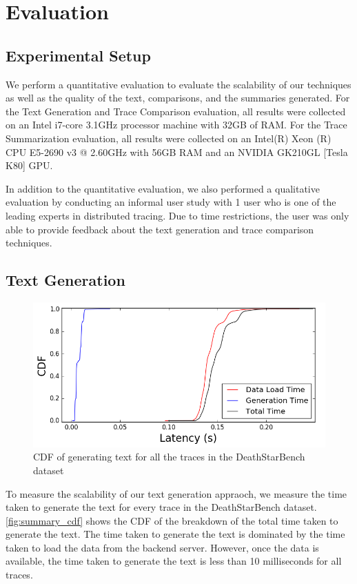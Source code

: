 \section{Evaluation}
\label{sec:evaluation}

\subsection{Experimental Setup}

We perform a quantitative evaluation to evaluate
the scalability of our techniques as well as the quality
of the text, comparisons, and the summaries generated.
For the Text Generation and Trace Comparison evaluation,
all results were collected on
an Intel i7-core 3.1GHz processor machine with 32GB of RAM.
For the Trace Summarization evaluation, all results were
collected on an Intel(R) Xeon (R) CPU E5-2690 v3 @ 2.60GHz
with 56GB RAM and an NVIDIA GK210GL [Tesla K80] GPU.

In addition to the quantitative evaluation, we also
performed a qualitative evaluation by conducting
an informal user study with 1 user who is one of the 
leading experts in distributed tracing. Due to time restrictions,
the user was only able to provide feedback about the text generation
and trace comparison techniques.

\subsection{Text Generation}

\begin{figure}[tbh]
    \centering
    \includegraphics[width=\linewidth]{"fig/summary_cdf"}
    \caption{CDF of generating text for all the traces in the DeathStarBench dataset}
    \label{fig:summary_cdf}
\end{figure}

To measure the scalability of our text generation appraoch, we measure the time taken
to generate the text for every trace in the DeathStarBench dataset. \autoref{fig:summary_cdf}
shows the CDF of the breakdown of the total time taken to generate the text. The time taken
to generate the text is dominated by the time taken to load the data from the backend server.
However, once the data is available, the time taken to generate the text is less than 10 milliseconds
for all traces.

